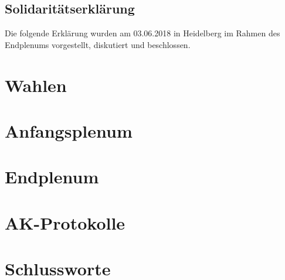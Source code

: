 \documentclass[ngerman, 10pt, openany]{scrbook}
\begin{document}
  \section{Solidaritätserklärung}
    Die folgende Erklärung wurden am 03.06.2018 in Heidelberg im Rahmen des Endplenums
    vorgestellt, diskutiert und beschlossen.
      

\chapter{Wahlen}
  

\chapter{Anfangsplenum}
  
\chapter{Endplenum}
  

\chapter{AK-Protokolle}
  
  
  
  
  
  
  
  
  
  
  
  
  
  
  
  
  
  
  
  
  
  
  
  
  
  
  
  
  
  
  
  
  
  
  
  
  
  
  

\emptychapter
\chapter{Schlussworte}
  
\end{document}

